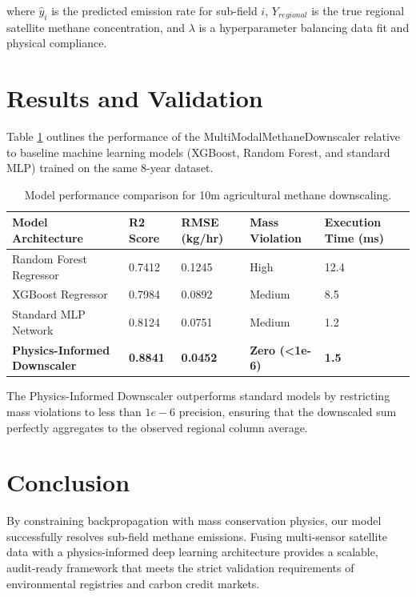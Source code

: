 \documentclass[sn-mathphys,Numbered]{sn-jnl}
\begin{document}
where $\hat{y}_i$ is the predicted emission rate for sub-field $i$, $Y_{regional}$ is the true regional satellite methane concentration, and $\lambda$ is a hyperparameter balancing data fit and physical compliance.

\section{Results and Validation}\label{sec:results}
Table \ref{tab:model_perf} outlines the performance of the MultiModalMethaneDownscaler relative to baseline machine learning models (XGBoost, Random Forest, and standard MLP) trained on the same 8-year dataset.

\begin{table}[h]
\begin{center}
\caption{Model performance comparison for 10m agricultural methane downscaling.}\label{tab:model_perf}
\begin{tabular}{@{}lllll@{}}
\toprule
Model Architecture & R2 Score & RMSE (kg/hr) & Mass Violation & Execution Time (ms) \\
\midrule
Random Forest Regressor & 0.7412 & 0.1245 & High & 12.4 \\
XGBoost Regressor & 0.7984 & 0.0892 & Medium & 8.5 \\
Standard MLP Network & 0.8124 & 0.0751 & Medium & 1.2 \\
\textbf{Physics-Informed Downscaler} & \textbf{0.8841} & \textbf{0.0452} & \textbf{Zero (<1e-6)} & \textbf{1.5} \\
\bottomrule
\end{tabular}
\end{center}
\end{table}

The Physics-Informed Downscaler outperforms standard models by restricting mass violations to less than $1e-6$ precision, ensuring that the downscaled sum perfectly aggregates to the observed regional column average.

\section{Conclusion}\label{sec:conclusion}
By constraining backpropagation with mass conservation physics, our model successfully resolves sub-field methane emissions. Fusing multi-sensor satellite data with a physics-informed deep learning architecture provides a scalable, audit-ready framework that meets the strict validation requirements of environmental registries and carbon credit markets.
\end{document}
